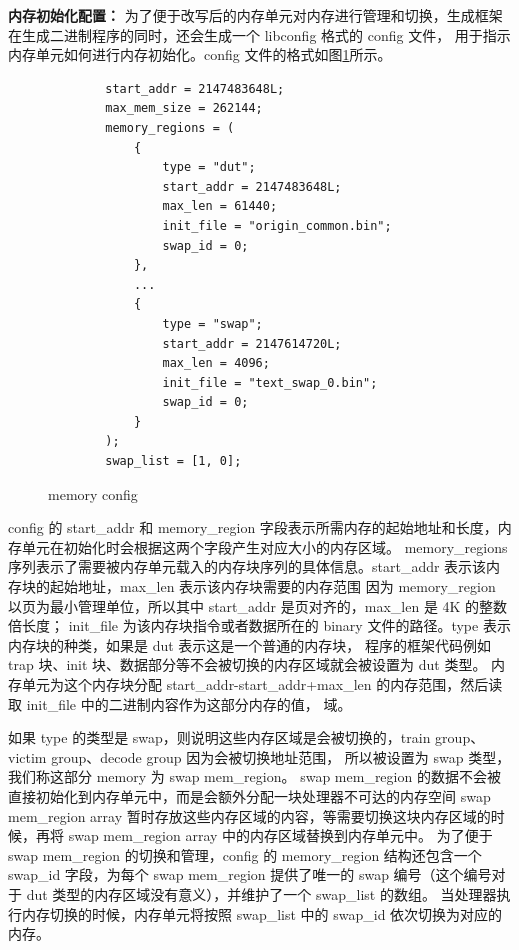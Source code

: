\textbf{内存初始化配置：}
为了便于改写后的内存单元对内存进行管理和切换，生成框架在生成二进制程序的同时，还会生成一个 libconfig 格式的 config 文件，
用于指示内存单元如何进行内存初始化。config 文件的格式如图\ref{code:memory-config}所示。\par

\begin{figure}[htbp]
    \centering
    \begin{verbatim}
        start_addr = 2147483648L;
        max_mem_size = 262144;
        memory_regions = (
            {
                type = "dut";
                start_addr = 2147483648L;
                max_len = 61440;
                init_file = "origin_common.bin";
                swap_id = 0;
            },
            ...
            {
                type = "swap";
                start_addr = 2147614720L;
                max_len = 4096;
                init_file = "text_swap_0.bin";
                swap_id = 0;
            }
        );
        swap_list = [1, 0];
    \end{verbatim}
    \caption{memory config}
    \label{code:memory-config}
\end{figure}

config 的 start\_addr 和 memory\_region 字段表示所需内存的起始地址和长度，内存单元在初始化时会根据这两个字段产生对应大小的内存区域。
memory\_regions 序列表示了需要被内存单元载入的内存块序列的具体信息。start\_addr 表示该内存块的起始地址，max\_len 表示该内存块需要的内存范围
因为 memory\_region 以页为最小管理单位，所以其中 start\_addr 是页对齐的，max\_len 是 4K 的整数倍长度；
init\_file 为该内存块指令或者数据所在的 binary 文件的路径。type 表示内存块的种类，如果是 dut 表示这是一个普通的内存块，
程序的框架代码例如 trap 块、init 块、数据部分等不会被切换的内存区域就会被设置为 dut 类型。
内存单元为这个内存块分配 start\_addr-start\_addr+max\_len 的内存范围，然后读取 init\_file 中的二进制内容作为这部分内存的值，
域。\par

如果 type 的类型是 swap，则说明这些内存区域是会被切换的，train group、victim group、decode group 因为会被切换地址范围，
所以被设置为 swap 类型，我们称这部分 memory 为 swap mem\_region。
swap mem\_region 的数据不会被直接初始化到内存单元中，而是会额外分配一块处理器不可达的内存空间 swap mem\_region array 
暂时存放这些内存区域的内容，等需要切换这块内存区域的时候，再将 swap mem\_region array 中的内存区域替换到内存单元中。
为了便于 swap mem\_region 的切换和管理，config 的 memory\_region 结构还包含一个 swap\_id 字段，为每个 swap mem\_region
提供了唯一的 swap 编号（这个编号对于 dut 类型的内存区域没有意义），并维护了一个 swap\_list 的数组。
当处理器执行内存切换的时候，内存单元将按照 swap\_list 中的 swap\_id 依次切换为对应的内存。\par 

